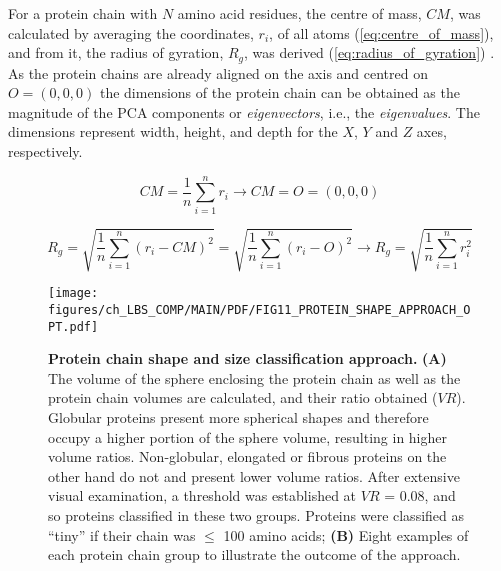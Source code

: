 For a protein chain with $N$ amino acid residues, the centre of mass, $CM$, was calculated by averaging the coordinates, $r_{i}$, of all atoms (\autoref{eq:centre_of_mass}), and from it, the radius of gyration, $R_{g}$, was derived (\autoref{eq:radius_of_gyration}) \cite{FIXMAN_1962_ROG}. As the protein chains are already aligned on the axis and centred on $O = (0, 0, 0)$ the dimensions of the protein chain can be obtained as the magnitude of the PCA components or \textit{eigenvectors}, i.e., the \textit{eigenvalues}. The dimensions represent width, height, and depth for the $X$, $Y$ and $Z$ axes, respectively.

\begin{equation}
CM = \frac{1}{n} \sum_{i=1}^{n} r_i \rightarrow CM = O = (0,0,0)
\label{eq:centre_of_mass}
\end{equation}

\begin{equation}
R_g = \sqrt{\frac{1}{n} \sum_{i=1}^{n} (r_i - CM)^2} = \sqrt{\frac{1}{n} \sum_{i=1}^{n} (r_i - O)^2} \rightarrow R_g = \sqrt{\frac{1}{n} \sum_{i=1}^{n} r_i^2}
\label{eq:radius_of_gyration}
\end{equation}

\begin{figure}[htb!]
    \centering
    \texttt{[image: figures/ch\_LBS\_COMP/MAIN/PDF/FIG11\_PROTEIN\_SHAPE\_APPROACH\_OPT.pdf]}
    \caption[Protein chain shape and size classification approach]{\textbf{Protein chain shape and size classification approach.} \textbf{(A)} The volume of the sphere enclosing the protein chain as well as the protein chain volumes are calculated, and their ratio obtained ($VR$). Globular proteins present more spherical shapes and therefore occupy a higher portion of the sphere volume, resulting in higher volume ratios. Non-globular, elongated or fibrous proteins on the other hand do not and present lower volume ratios. After extensive visual examination, a threshold was established at $VR$ = 0.08, and so proteins classified in these two groups. Proteins were classified as ``tiny'' if their chain was $\leq$ 100 amino acids; \textbf{(B)} Eight examples of each protein chain group to illustrate the outcome of the approach.}
    \label{fig:protein_class_approach}
\end{figure}


